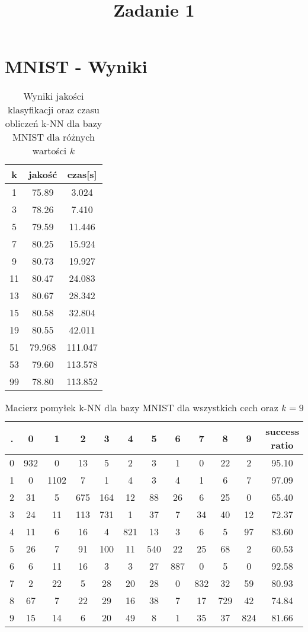 \documentclass{classrepshort}
\author{
  \studentinfo{Hubert Marcinkowski}{214942} \and
  \studentinfo{Artur Wróblewski}{214985}
}
\title{Zadanie 1}
\begin{document}
\maketitle

\section{MNIST - Wyniki}
\begin{table}[h!]
  \centering
  \caption{Wyniki jakości klasyfikacji oraz czasu obliczeń k-NN dla bazy MNIST dla różnych wartości $k$}
  \label{tab:tab1}
  \begin{tabular}{|c|c|c|}
    \hline
	k & jakość & czas[s]\\
    \hline
	1 & 75.89 & 3.024\\
    \hline
	3 & 78.26 & 7.410\\
	\hline
	5 & 79.59 & 11.446\\
	\hline
	7 & 80.25 & 15.924\\
	\hline
	9 & 80.73 & 19.927\\
	\hline
	11 & 80.47 & 24.083\\
	\hline
	13 & 80.67 & 28.342\\
	\hline
	15 & 80.58 & 32.804\\
	\hline
	19 & 80.55 & 42.011\\
	\hline
	51 & 79.968 & 111.047\\
	\hline
	53 & 79.60 & 113.578\\
	\hline
	99 & 78.80 & 113.852\\
	\hline
  \end{tabular}
\end{table}

\begin{table}[h!]
  \centering
  \caption{Macierz pomyłek k-NN dla bazy MNIST dla wszystkich cech oraz $k=9$}
  \label{tab:tab1}
  \begin{tabular}{|c|c|c|c|c|c|c|c|c|c|c|c|}
    \hline
	. & 0 & 1 & 2 & 3 & 4 & 5 & 6 & 7 & 8 & 9 & success ratio \\
    \hline
	0 & 932 & 0 & 13 & 5 & 2 & 3 & 1 & 0 & 22 & 2 & 95.10\\
    \hline
	1 & 0 & 1102 & 7 & 1 & 4 & 3 & 4 & 1 & 6 & 7 & 97.09\\
	\hline
	2 & 31 & 5 & 675 & 164 & 12 & 88 & 26 & 6 & 25 & 0 & 65.40\\
	\hline
	3 & 24 & 11 & 113 & 731 & 1 & 37 & 7 & 34 & 40 & 12 & 72.37\\
	\hline
	4 & 11 & 6 & 16 & 4 & 821 & 13 & 3 & 6 & 5 & 97 & 83.60\\
	\hline
	5 & 26 & 7 & 91 & 100 & 11 & 540 & 22 & 25 & 68 & 2 & 60.53\\
	\hline
	6 & 6 & 11 & 16 & 3 & 3 & 27 & 887 & 0 & 5 & 0 & 92.58\\
	\hline
	7 & 2 & 22 & 5 & 28 & 20 & 28 & 0 & 832 & 32 & 59 & 80.93\\
	\hline
	8 & 67 & 7 & 22 & 29 & 16 & 38 & 7 & 17 & 729 & 42 & 74.84\\
	\hline
	9 & 15 & 14 & 6 & 20 & 49 & 8 & 1 & 35 & 37 & 824 & 81.66\\    
    \hline
  \end{tabular}
\end{table}
\end{document}

